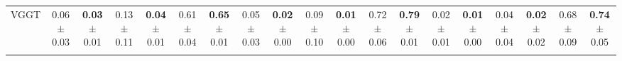 \begin{table}[ht]
{\begin{tabular}{l *{3}{cc} *{3}{cc} *{3}{cc}}
VGGT 
& \makecell{0.06 \\ {\tiny $\pm$ 0.03}} & \makecell{\textbf{0.03} \\ {\tiny $\pm$ 0.01}} 
& \makecell{0.13 \\ {\tiny $\pm$ 0.11}} & \makecell{\textbf{0.04} \\ {\tiny $\pm$ 0.01}} 
& \makecell{0.61 \\ {\tiny $\pm$ 0.04}} & \makecell{\textbf{0.65} \\ {\tiny $\pm$ 0.01}} 
& \makecell{0.05 \\ {\tiny $\pm$ 0.03}} & \makecell{\textbf{0.02} \\ {\tiny $\pm$ 0.00}} 
& \makecell{0.09 \\ {\tiny $\pm$ 0.10}} & \makecell{\textbf{0.01} \\ {\tiny $\pm$ 0.00}} 
& \makecell{0.72 \\ {\tiny $\pm$ 0.06}} & \makecell{\textbf{0.79} \\ {\tiny $\pm$ 0.01}} 
& \makecell{0.02 \\ {\tiny $\pm$ 0.01}} & \makecell{\textbf{0.01} \\ {\tiny $\pm$ 0.00}} 
& \makecell{0.04 \\ {\tiny $\pm$ 0.04}} & \makecell{\textbf{0.02} \\ {\tiny $\pm$ 0.02}} 
& \makecell{0.68 \\ {\tiny $\pm$ 0.09}} & \makecell{\textbf{0.74} \\ {\tiny $\pm$ 0.05}} \\
\addlinespace[3pt]


\end{tabular}}
\end{table}
